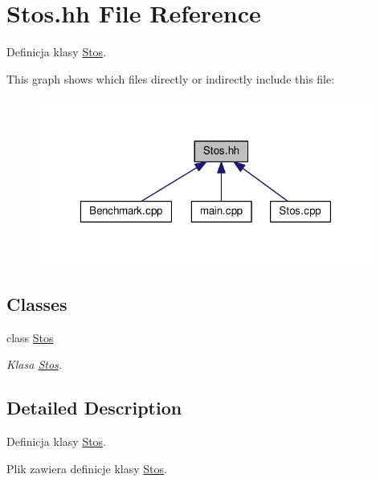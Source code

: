 \hypertarget{a00019}{}\section{Stos.\+hh File Reference}
\label{a00019}


Definicja klasy \hyperlink{a00006}{Stos}.  


This graph shows which files directly or indirectly include this file\+:\nopagebreak
\begin{figure}[H]
\begin{center}
\leavevmode
\includegraphics[width=313pt]{a00037}
\end{center}
\end{figure}
\subsection*{Classes}
\begin{DoxyCompactItemize}
\item 
class \hyperlink{a00006}{Stos}
\begin{DoxyCompactList}\small\item\em Klasa \hyperlink{a00006}{Stos}. \end{DoxyCompactList}\end{DoxyCompactItemize}


\subsection{Detailed Description}
Definicja klasy \hyperlink{a00006}{Stos}. 

Plik zawiera definicje klasy \hyperlink{a00006}{Stos}. 